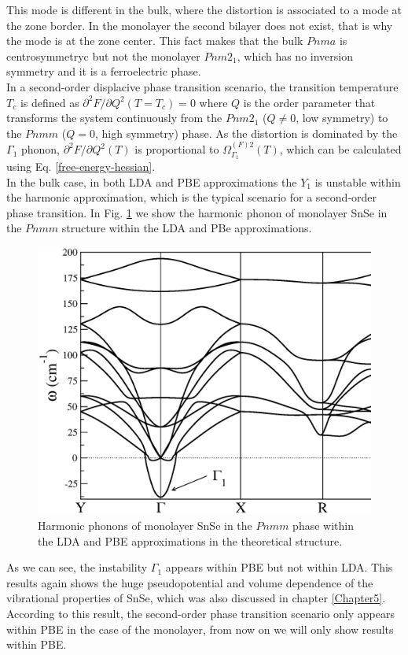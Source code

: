 This mode is different in the bulk, where the distortion is associated to a mode at the 
zone border. In the monolayer the second bilayer does not exist, that is why the mode is at the zone center. This 
fact makes that the bulk $Pnma$ is centrosymmetryc but not the monolayer $Pnm2_{1}$, which has no inversion symmetry 
and it is a ferroelectric phase. \\

In a second-order displacive phase transition scenario, the transition temperature $T_{c}$ is defined as 
$\partial^{2}F/\partial Q^{2}(T=T_{c})=0$ where $Q$ is the order parameter that transforms the system continuously 
from the $Pnm2_{1}$ ($Q\ne0$, low symmetry) to the $Pnmm$ ($Q=0$, high symmetry) phase. As the distortion is 
dominated by the $\Gamma_{1}$ phonon, $\partial^{2}F/\partial Q^{2}(T)$ is proportional to 
$\Omega^{(F)2}_{\Gamma_{1}}(T)$, which can be calculated using Eq. \ref{free-energy-hessian}. \\

In the bulk case, in both LDA and PBE approximations the $Y_{1}$ is unstable within the harmonic approximation, 
which is the typical scenario for a second-order phase transition. In Fig. \ref{harmonic-mono} we show the 
harmonic phonon of monolayer SnSe in the $Pnmm$ structure within the LDA and PBe approximations. 
\begin{figure}[h]
\includegraphics[width=\linewidth]{Figures/harmonic-mono.eps}
\caption[Harmonic phonons of monolayer SnSe.]{Harmonic phonons of monolayer SnSe in the $Pnmm$ phase within the LDA 
and PBE approximations in the theoretical structure.}
\label{harmonic-mono}
\end{figure}
As we can see, the instability $\Gamma_{1}$ appears within PBE but not within LDA. This results again shows the huge 
pseudopotential and volume dependence of the vibrational properties of SnSe, which was also discussed in 
chapter \ref{Chapter5}. According to this result, the second-order phase transition scenario only appears within PBE 
in the case of the monolayer, from now on we will only show results within PBE. \\

